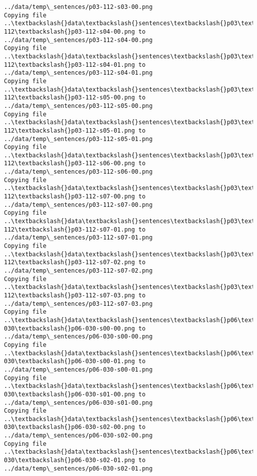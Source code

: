 \documentclass[11pt]{article}
\begin{document}
\begin{Verbatim}[commandchars=\\\{\}]
../data/temp\_sentences/p03-112-s03-00.png
Copying file ..\textbackslash{}data\textbackslash{}sentences\textbackslash{}p03\textbackslash{}p03-112\textbackslash{}p03-112-s04-00.png to
../data/temp\_sentences/p03-112-s04-00.png
Copying file ..\textbackslash{}data\textbackslash{}sentences\textbackslash{}p03\textbackslash{}p03-112\textbackslash{}p03-112-s04-01.png to
../data/temp\_sentences/p03-112-s04-01.png
Copying file ..\textbackslash{}data\textbackslash{}sentences\textbackslash{}p03\textbackslash{}p03-112\textbackslash{}p03-112-s05-00.png to
../data/temp\_sentences/p03-112-s05-00.png
Copying file ..\textbackslash{}data\textbackslash{}sentences\textbackslash{}p03\textbackslash{}p03-112\textbackslash{}p03-112-s05-01.png to
../data/temp\_sentences/p03-112-s05-01.png
Copying file ..\textbackslash{}data\textbackslash{}sentences\textbackslash{}p03\textbackslash{}p03-112\textbackslash{}p03-112-s06-00.png to
../data/temp\_sentences/p03-112-s06-00.png
Copying file ..\textbackslash{}data\textbackslash{}sentences\textbackslash{}p03\textbackslash{}p03-112\textbackslash{}p03-112-s07-00.png to
../data/temp\_sentences/p03-112-s07-00.png
Copying file ..\textbackslash{}data\textbackslash{}sentences\textbackslash{}p03\textbackslash{}p03-112\textbackslash{}p03-112-s07-01.png to
../data/temp\_sentences/p03-112-s07-01.png
Copying file ..\textbackslash{}data\textbackslash{}sentences\textbackslash{}p03\textbackslash{}p03-112\textbackslash{}p03-112-s07-02.png to
../data/temp\_sentences/p03-112-s07-02.png
Copying file ..\textbackslash{}data\textbackslash{}sentences\textbackslash{}p03\textbackslash{}p03-112\textbackslash{}p03-112-s07-03.png to
../data/temp\_sentences/p03-112-s07-03.png
Copying file ..\textbackslash{}data\textbackslash{}sentences\textbackslash{}p06\textbackslash{}p06-030\textbackslash{}p06-030-s00-00.png to
../data/temp\_sentences/p06-030-s00-00.png
Copying file ..\textbackslash{}data\textbackslash{}sentences\textbackslash{}p06\textbackslash{}p06-030\textbackslash{}p06-030-s00-01.png to
../data/temp\_sentences/p06-030-s00-01.png
Copying file ..\textbackslash{}data\textbackslash{}sentences\textbackslash{}p06\textbackslash{}p06-030\textbackslash{}p06-030-s01-00.png to
../data/temp\_sentences/p06-030-s01-00.png
Copying file ..\textbackslash{}data\textbackslash{}sentences\textbackslash{}p06\textbackslash{}p06-030\textbackslash{}p06-030-s02-00.png to
../data/temp\_sentences/p06-030-s02-00.png
Copying file ..\textbackslash{}data\textbackslash{}sentences\textbackslash{}p06\textbackslash{}p06-030\textbackslash{}p06-030-s02-01.png to
../data/temp\_sentences/p06-030-s02-01.png

\end{Verbatim}
\end{document}
